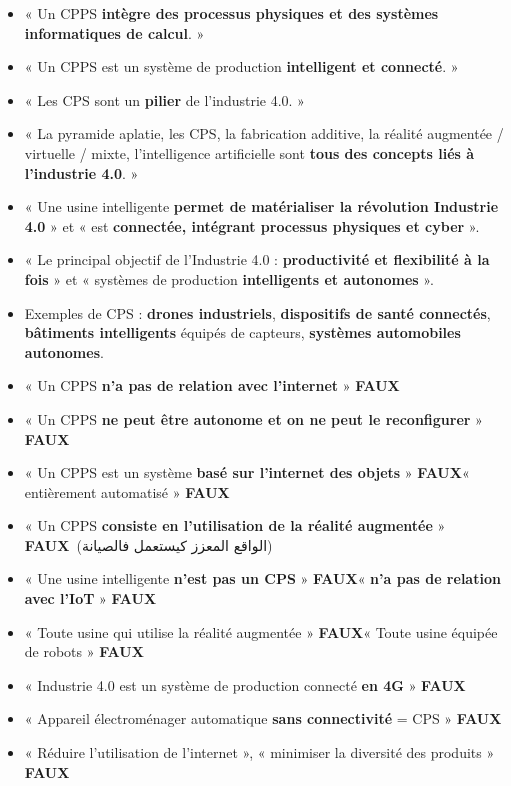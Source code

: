 \documentclass[11pt,a4paper]{article}
\newcommand{\ar}[1]{\textarabic{#1}}
\newcommand{\faux}{\textcolor{rouge}{\textbf{FAUX}}}
\begin{document}
\begin{examen}
\begin{itemize}
\item « Un CPPS \textbf{intègre des processus physiques et des systèmes informatiques de calcul}. »
\item « Un CPPS est un système de production \textbf{intelligent et connecté}. »
\item « Les CPS sont un \textbf{pilier} de l'industrie 4.0. »
\item « La pyramide aplatie, les CPS, la fabrication additive, la réalité augmentée / virtuelle / mixte, l'intelligence artificielle sont \textbf{tous des concepts liés à l'industrie 4.0}. »
\item « Une usine intelligente \textbf{permet de matérialiser la révolution Industrie 4.0} » et « est \textbf{connectée, intégrant processus physiques et cyber} ».
\item « Le principal objectif de l'Industrie 4.0 : \textbf{productivité et flexibilité à la fois} » et « systèmes de production \textbf{intelligents et autonomes} ».
\item Exemples de CPS : \textbf{drones industriels}, \textbf{dispositifs de santé connectés}, \textbf{bâtiments intelligents} équipés de capteurs, \textbf{systèmes automobiles autonomes}.
\end{itemize}
\end{examen}
\begin{piege}
\begin{itemize}
\item « Un CPPS \textbf{n'a pas de relation avec l'internet} » \faux
\item « Un CPPS \textbf{ne peut être autonome et on ne peut le reconfigurer} » \faux
\item « Un CPPS est un système \textbf{basé sur l'internet des objets} » \faux \quad « entièrement automatisé » \faux
\item « Un CPPS \textbf{consiste en l'utilisation de la réalité augmentée} » \faux \ \ar{(الواقع المعزز كيستعمل فالصيانة)}
\item « Une usine intelligente \textbf{n'est pas un CPS} » \faux \quad « \textbf{n'a pas de relation avec l'IoT} » \faux
\item « Toute usine qui utilise la réalité augmentée » \faux \quad « Toute usine équipée de robots » \faux
\item « Industrie 4.0 est un système de production connecté \textbf{en 4G} » \faux
\item « Appareil électroménager automatique \textbf{sans connectivité} = CPS » \faux
\item « Réduire l'utilisation de l'internet », « minimiser la diversité des produits » \faux
\end{itemize}
\end{piege}
\end{document}
